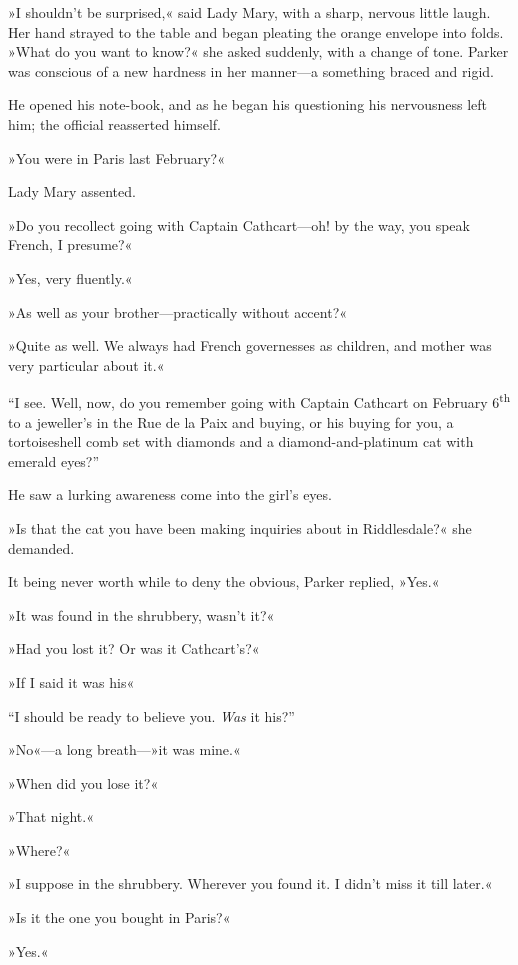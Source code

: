 »I shouldn't be surprised,« said Lady Mary, with a sharp, nervous little laugh. Her hand strayed to the table and began pleating the orange envelope into folds. »What do you want to know?« she asked suddenly, with a change of tone. Parker was conscious of a new hardness in her manner\allowbreak---\allowbreak a something braced and rigid.

He opened his note-book, and as he began his questioning his nervousness left him; the official reasserted himself.

»You were in Paris last February?«

Lady Mary assented.

»Do you recollect going with Captain Cathcart\allowbreak---\allowbreak oh! by the way, you speak French, I presume?«

»Yes, very fluently.«

»As well as your brother\allowbreak---\allowbreak practically without accent?«

»Quite as well. We always had French governesses as children, and mother was very particular about it.«

\enquote{I see. Well, now, do you remember going with Captain Cathcart on February 6\textsuperscript{th} to a jeweller's in the Rue de la Paix and buying, or his buying for you, a tortoiseshell comb set with diamonds and a diamond-and-platinum cat with emerald eyes?}

He saw a lurking awareness come into the girl's eyes.

»Is that the cat you have been making inquiries about in Riddlesdale?« she demanded.

It being never worth while to deny the obvious, Parker replied, »Yes.«

»It was found in the shrubbery, wasn't it?«

»Had you lost it? Or was it Cathcart's?«

»If I said it was his\longdash«

\enquote{I should be ready to believe you. \textit{Was} it his?}

»No«---a long breath---»it was mine.«

»When did you lose it?«

»That night.«

»Where?«

»I suppose in the shrubbery. Wherever you found it. I didn't miss it till later.«

»Is it the one you bought in Paris?«

»Yes.«

